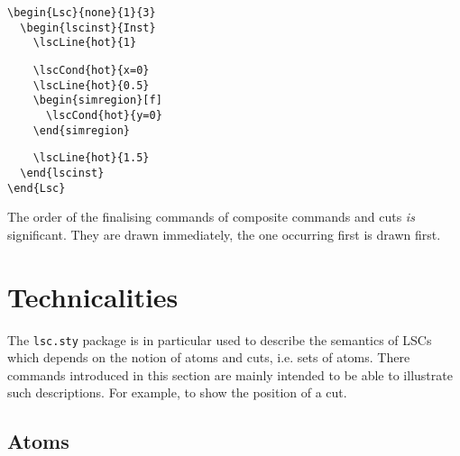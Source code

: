 \documentclass{article}
\newcommand{\sty}[1]{\texttt{#1.sty}}
\newcommand{\lscsty}{\sty{lsc}}
\begin{document}
\begin{center}%
\begin{minipage}{0.3\textwidth}
\end{minipage}
\hfill
\begin{minipage}{0.36\textwidth}%
\small%
{\gray\begin{verbatim}
\begin{Lsc}{none}{1}{3}
  \begin{lscinst}{Inst}
    \lscLine{hot}{1}
\end{verbatim}}%
\verbunskip%
{\begin{verbatim}
    \lscCond{hot}{x=0}
    \lscLine{hot}{0.5}
    \begin{simregion}[f]
      \lscCond{hot}{y=0}
    \end{simregion}
\end{verbatim}}%
\verbunskip%
{\gray\begin{verbatim}
    \lscLine{hot}{1.5}
  \end{lscinst}
\end{Lsc}
\end{verbatim}}%
\end{minipage}
\end{center}%

The order of the finalising commands of composite commands and cuts \emph{is}
significant.  They are drawn immediately, the one occurring first is drawn
first.


\section{Technicalities}
\label{sec:tech}

The \lscsty{} package is in particular used to describe the semantics of LSCs
which depends on the notion of atoms and cuts, i.e. sets of atoms.
%
There commands introduced in this section are mainly intended to be able to
illustrate such descriptions.  For example, to show the position of a cut.

\subsection{Atoms}
\label{sec:tech:atom}
\end{document}

